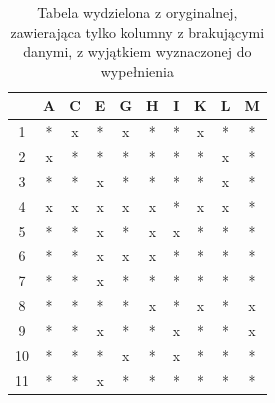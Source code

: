 \documentclass[12pt,twoside]{article}
\begin{document}
\begin{enumerate}[label=\arabic*), leftmargin=1.25cm]
          \begin{table}[ht]
              \caption{Tabela wydzielona z oryginalnej, zawierająca tylko kolumny z brakującymi danymi,
                  z wyjątkiem wyznaczonej do wypełnienia}
              \centering
              \begin{tabular}{|c|c|c|c|c|c|c|c|c|c|}
                  \hline
                     & A & C & E & G & H & I & K & L & M \\ \hline
                  1  & * & x & * & x & * & * & x & * & * \\ \hline
                  2  & x & * & * & * & * & * & * & x & * \\ \hline
                  3  & * & * & x & * & * & * & * & x & * \\ \hline
                  4  & x & x & x & x & x & * & x & x & * \\ \hline
                  5  & * & * & x & * & x & x & * & * & * \\ \hline
                  6  & * & * & x & x & x & * & * & * & * \\ \hline
                  7  & * & * & x & * & * & * & * & * & * \\ \hline
                  8  & * & * & * & * & x & * & x & * & x \\ \hline
                  9  & * & * & x & * & * & x & * & * & x \\ \hline
                  10 & * & * & * & x & * & x & * & * & * \\ \hline
                  11 & * & * & x & * & * & * & * & * & * \\ \hline
              \end{tabular}
              \label{tab:2_nan}
          \end{table}
          \FloatBarrier


\end{enumerate}
\end{document}
